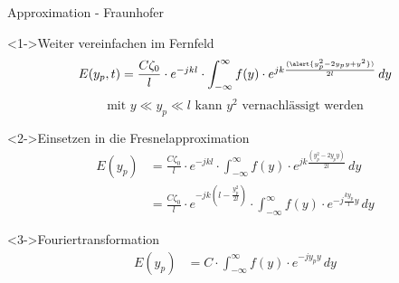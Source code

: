 \begin{frame}{Approximation - Fraunhofer}
    \begin{block}<1->{Weiter vereinfachen im Fernfeld}
        \begin{equation*}
            E(y_p, t)
            =
            \frac{C\zeta_0}{l} \cdot e^{-jkl} \cdot \int_{-\infty}^{\infty}f(y)\cdot e^{jk\frac{(\alert{y_p^2 - 2y_py + y^2})}{2l}} \,dy
        \end{equation*}
        \begin{equation*}
            \text{mit }
            y
            \ll
            y_p
            \ll
            l
            \text{ kann }
            y^2
            \text{ vernachlässigt werden}
        \end{equation*}
    \end{block}
    \begin{block}<2->{Einsetzen in die Fresnelapproximation}
        \begin{align*}
            E(y_p)
            &=
            \frac{C\zeta_0}{l} \cdot e^{-jkl} \cdot \int_{-\infty}^{\infty}f(y)\cdot e^{jk\frac{(y_p^2 - 2y_py)}{2l}} \,dy
            \\
            &=
            \frac{C\zeta_0}{l} \cdot e^{-jk\left(l-\frac{y_p^2}{2l}\right)} \cdot \int_{-\infty}^{\infty}f(y)\cdot e^{-j\frac{ky_p}{l}y} \,dy
        \end{align*}
    \end{block}
    \begin{exampleblock}<3->{Fouriertransformation}
        \begin{align*}
            E(y_p)
            &=
            C \cdot \int_{-\infty}^{\infty}f(y)\cdot e^{-jy_py} \,dy
        \end{align*}
    \end{exampleblock}
\end{frame}
